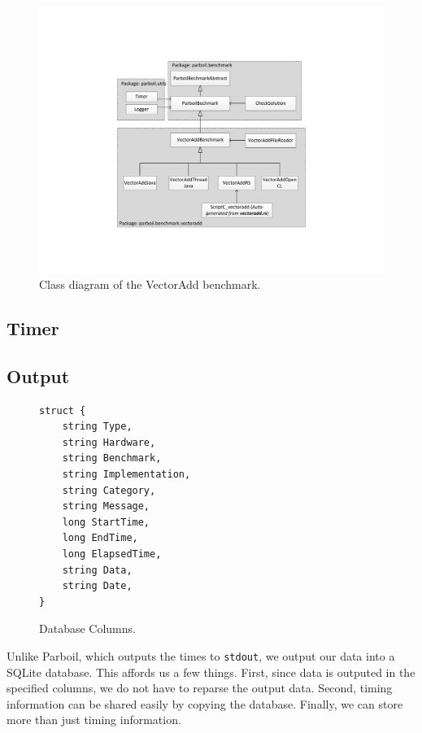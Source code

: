 \begin{figure}[t!]
\includegraphics[scale=0.5]{figs/vectoradd_class_diagram.pdf}
\caption{Class diagram of the VectorAdd benchmark.}
\label{fig:class_diagram}
\centering
\end{figure}

\subsection*{Timer}



\subsection*{Output}


\begin{figure}[t!]
\begin{verbatim}
struct {
	string Type,
	string Hardware,
	string Benchmark,
	string Implementation,
	string Category,
	string Message,
	long StartTime,
	long EndTime,
	long ElapsedTime,
	string Data,
	string Date,
}
\end{verbatim}
\caption{Database Columns.}
\label{fig:database}
\centering
\end{figure}

Unlike Parboil, which outputs the times to {\tt stdout}, we output our data into a SQLite database.
This affords us a few things.
First, since data is outputed in the specified columns, we do not have to reparse the output data.
Second, timing information can be shared easily by copying the database.
Finally, we can store more than just timing information.


